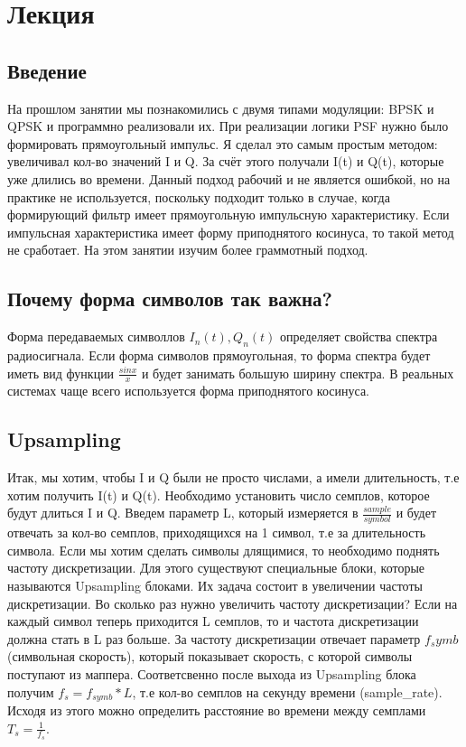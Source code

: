 \chapter{Лекция}
\label{ch:intro}

\section*{\textbf{Введение}}

На прошлом занятии мы познакомились с двумя типами модуляции: BPSK и QPSK и программно реализовали их. При реализации логики
PSF нужно было формировать прямоугольный импульс. Я сделал это самым простым методом: увеличивал кол-во значений I и Q. За счёт этого
получали I(t) и Q(t), которые уже длились во времени. Данный подход рабочий и не является ошибкой, но на практике не используется,
поскольку подходит только в случае, когда формирующий фильтр имеет прямоугольную импульсную характеристику. Если импульсная характеристика
имеет форму приподнятого косинуса, то такой метод не сработает. На этом занятии изучим более граммотный подход.


\section*{\textbf{Почему форма символов так важна?}}
Форма передаваемых символлов $I_n(t), Q_n(t)$ определяет свойства спектра радиосигнала. Если форма символов прямоугольная, то форма
спектра будет иметь вид функции $\frac{sinx}{x}$ и будет занимать большую ширину спектра. В реальных системах чаще всего используется форма приподнятого косинуса.

\section*{\textbf{Upsampling}}

Итак, мы хотим, чтобы I и Q были не просто числами, а имели длительность, т.е хотим получить I(t) и Q(t). 
Необходимо установить число семплов, которое будут длиться I и Q. Введем параметр L, который измеряется в $\frac{sample}{symbol}$
и будет отвечать за кол-во семплов, приходящихся на 1 символ, т.е за длительность символа. Если мы хотим сделать символы длящимися,
то необходимо поднять частоту дискретизации. Для этого существуют специальные блоки, которые называются Upsampling блоками. Их задача
состоит в увеличении частоты дискретизации. Во сколько раз нужно увеличить частоту дискретизации? Если на каждый символ теперь
приходится L семплов, то и частота дискретизации должна стать в L раз больше. За частоту дискретизации отвечает параметр $f_symb$ (символьная скорость),
который показывает скорость, с которой символы поступают из маппера. Соответсвенно после выхода из Upsampling блока получим
$f_s = f_{symb} * L$, т.е кол-во семплов на секунду времени (sample\_rate). Исходя из этого можно определить расстояние во времени
между семплами $T_s = \frac{1}{f_s}$.

